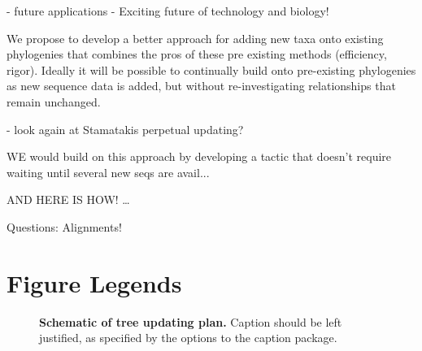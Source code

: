 \documentclass[10pt]{article}
\begin{document}
   - future applications
   - Exciting future of technology and biology!




We propose to develop a better approach for adding new taxa onto existing phylogenies that combines the pros of these pre existing methods (efficiency, rigor). Ideally it will be possible to continually build onto pre-existing phylogenies as new sequence data is added, but without re-investigating relationships that remain unchanged.

- look again at Stamatakis perpetual updating?


WE would build on this approach by developing a tactic that doesn’t require waiting until several new seqs are avail...


AND HERE IS HOW! …

Questions:
Alignments!



%


\section*{Figure Legends}
\begin{figure}[!ht]
\begin{center}
\end{center}
\caption{
{\bf Schematic of tree updating plan.}  Caption  should be left justified, as specified by the options to the caption package.
}
\label{Figure_label}
\end{figure}
\end{document}
